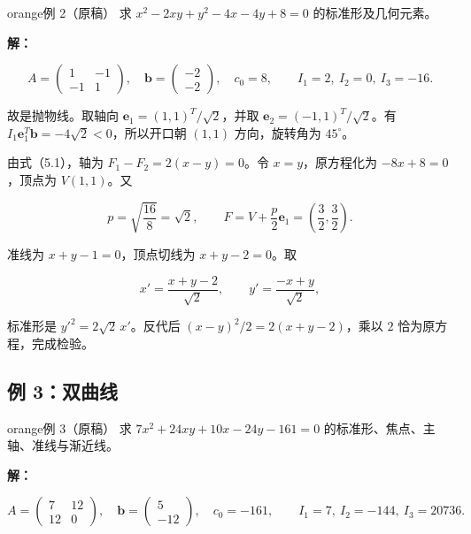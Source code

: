 \documentclass[11pt,a4paper]{article}
\begin{document}
\begin{sboxenv}{orange}{例 2（原稿）}
求 \(x^2-2xy+y^2-4x-4y+8=0\) 的标准形及几何元素。

\end{sboxenv}

\textbf{解：}

\begin{equation*}
A=\begin{pmatrix}1&-1\\-1&1\end{pmatrix},\quad\boldsymbol b=\begin{pmatrix}-2\\-2\end{pmatrix},\quad c_0=8,\qquad I_1=2,\ I_2=0,\ I_3=-16.
\end{equation*}

故是抛物线。取轴向 \(\boldsymbol e_1=(1,1)^T/\sqrt2\)，并取
\(\boldsymbol e_2=(-1,1)^T/\sqrt2\)。有
\(I_1\boldsymbol e_1^T\boldsymbol b=-4\sqrt2<0\)，所以开口朝 \((1,1)\)
方向，旋转角为 \(45^\circ\)。

由式（5.1），轴为 \(F_1-F_2=2(x-y)=0\)。令 \(x=y\)，原方程化为
\(-8x+8=0\)，顶点为 \(V(1,1)\)。又

\begin{equation*}
p=\sqrt{\frac{16}{8}}=\sqrt2,\qquad F=V+\frac p2\boldsymbol e_1=\left(\frac32,\frac32\right).
\end{equation*}

准线为 \(x+y-1=0\)，顶点切线为 \(x+y-2=0\)。取

\begin{equation*}
x'=\frac{x+y-2}{\sqrt2},\qquad y'=\frac{-x+y}{\sqrt2},
\end{equation*}

标准形是 \(y'^2=2\sqrt2\,x'\)。反代后 \((x-y)^2/2=2(x+y-2)\)，乘以 \(2\)
恰为原方程，完成检验。

\subsection{例 3：双曲线}\label{ux4f8b-3ux53ccux66f2ux7ebf}

\begin{sboxenv}{orange}{例 3（原稿）}
求 \(7x^2+24xy+10x-24y-161=0\) 的标准形、焦点、主轴、准线与渐近线。

\end{sboxenv}

\textbf{解：}

\begin{equation*}
A=\begin{pmatrix}7&12\\12&0\end{pmatrix},\quad\boldsymbol b=\begin{pmatrix}5\\-12\end{pmatrix},\quad c_0=-161,\qquad I_1=7,\ I_2=-144,\ I_3=20736.
\end{equation*}
\end{document}
